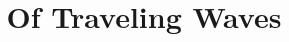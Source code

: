 \documentclass{NSF}
\begin{document}

\title{Of Traveling Waves}



%

\newpage{}
\renewcommand\refname{References Cited}



%

%

%

%

\end{document}
